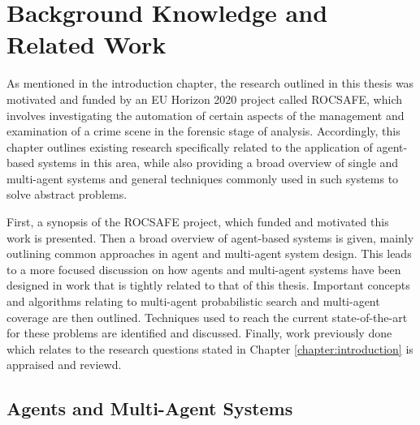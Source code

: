 

\chapter{Background Knowledge and Related Work}\label{chapter:Background}

\workinprogress
As mentioned in the introduction chapter, the research outlined in this thesis was motivated and funded by an EU Horizon 2020 project called ROCSAFE, which involves investigating the automation of certain aspects of the management and examination of a crime scene in the forensic stage of analysis. Accordingly, this chapter outlines existing research specifically related to the application of agent-based systems in this area, while also providing a broad overview of single and multi-agent systems and general techniques commonly used in such systems to solve abstract problems. \par
First, a synopsis of the ROCSAFE project, which funded and motivated this work is presented. Then a broad overview of agent-based systems is given, mainly outlining common approaches in agent and multi-agent system design. This leads to a more focused discussion on how agents and multi-agent systems have been designed in work that is tightly related to that of this thesis. Important concepts and algorithms relating to multi-agent probabilistic search and multi-agent coverage are then outlined. Techniques used to reach the current state-of-the-art for these problems are identified and discussed. Finally, work previously done 
which relates to the research questions stated in Chapter \ref{chapter:introduction} is appraised and reviewd.




\section{Agents and Multi-Agent Systems}


